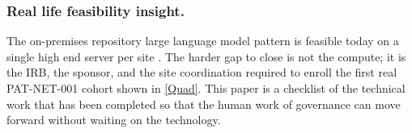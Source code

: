 \begin{sectionaccent}
\subsubsection*{Real life feasibility insight.} The on-premises
repository large language model pattern is feasible today on a
single high end server per site
\cite{anthropic_claude_opus_47_2026, unitree_h2_2026}. The harder gap
to close is not the compute; it is the IRB, the sponsor, and the site
coordination required to enroll the first real PAT-NET-001 cohort shown in \autoref{Quad}.
This paper is a checklist of the technical work that has been
completed so that the human work of governance can move forward
without waiting on the technology.


\end{sectionaccent}
